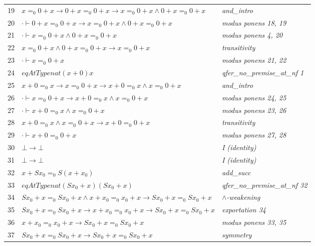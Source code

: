 \begin{longtable}{r l l}
19 & $x  =_0  0  +  x  \to  0  +  x  =_0  0  +  x  \to  x  =_0  0  +  x  \land  0  +  x  =_0  0  +  x$ & \textit{and\_intro} \\
20 & $\cdot  \vdash  0  +  x  =_0  0  +  x  \to  x  =_0  0  +  x  \land  0  +  x  =_0  0  +  x$ & \textit{modus ponens 18, 19} \\
21 & $\cdot  \vdash  x  =_0  0  +  x  \land  0  +  x  =_0  0  +  x$ & \textit{modus ponens 4, 20} \\
22 & $x  =_0  0  +  x  \land  0  +  x  =_0  0  +  x  \to  x  =_0  0  +  x$ & \textit{transitivity} \\
23 & $\cdot  \vdash  x  =_0  0  +  x$ & \textit{modus ponens 21, 22} \\
24 & $eqAtType nat (x  +  0) x$ & \textit{qfer\_no\_premise\_at\_nf 1} \\
25 & $x  +  0  =_0  x  \to  x  =_0  0  +  x  \to  x  +  0  =_0  x  \land  x  =_0  0  +  x$ & \textit{and\_intro} \\
26 & $\cdot  \vdash  x  =_0  0  +  x  \to  x  +  0  =_0  x  \land  x  =_0  0  +  x$ & \textit{modus ponens 24, 25} \\
27 & $\cdot  \vdash  x  +  0  =_0  x  \land  x  =_0  0  +  x$ & \textit{modus ponens 23, 26} \\
28 & $x  +  0  =_0  x  \land  x  =_0  0  +  x  \to  x  +  0  =_0  0  +  x$ & \textit{transitivity} \\
29 & $\cdot  \vdash  x  +  0  =_0  0  +  x$ & \textit{modus ponens 27, 28} \\
30 & $\bot   \to  \bot $ & \textit{I (identity)} \\
31 & $\bot   \to  \bot $ & \textit{I (identity)} \\
32 & $x  +  S x_{0}  =_0  S (x  +  x_{0})$ & \textit{add\_succ} \\
33 & $eqAtType nat (S x_{0}  +  x) (S x_{0}  +  x)$ & \textit{qfer\_no\_premise\_at\_nf 32} \\
34 & $S x_{0}  +  x  =_0  S x_{0}  +  x  \land  x  +  x_{0}  =_0  x_{0}  +  x  \to  S x_{0}  +  x  =_0  S x_{0}  +  x$ & \textit{$\land$-weakening} \\
35 & $S x_{0}  +  x  =_0  S x_{0}  +  x  \to  x  +  x_{0}  =_0  x_{0}  +  x  \to  S x_{0}  +  x  =_0  S x_{0}  +  x$ & \textit{exportation 34} \\
36 & $x  +  x_{0}  =_0  x_{0}  +  x  \to  S x_{0}  +  x  =_0  S x_{0}  +  x$ & \textit{modus ponens 33, 35} \\
37 & $S x_{0}  +  x  =_0  S x_{0}  +  x  \to  S x_{0}  +  x  =_0  S x_{0}  +  x$ & \textit{symmetry} \\

\end{longtable}
